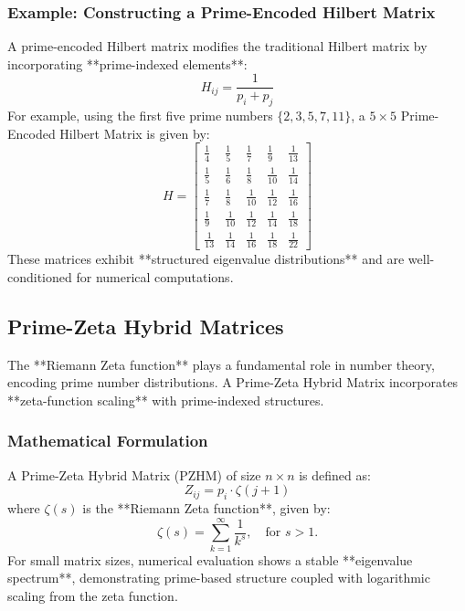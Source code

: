 \documentclass{article}
\theoremstyle{plain}
\begin{document}
\subsubsection{Example: Constructing a Prime-Encoded Hilbert Matrix}
A prime-encoded Hilbert matrix modifies the traditional Hilbert matrix by incorporating **prime-indexed elements**:
\begin{equation}
    H_{ij} = \frac{1}{p_i + p_j}
\end{equation}
For example, using the first five prime numbers \( \{2, 3, 5, 7, 11\} \), a \( 5 \times 5 \) Prime-Encoded Hilbert Matrix is given by:
\[
H =
\begin{bmatrix}
\frac{1}{4} & \frac{1}{5} & \frac{1}{7} & \frac{1}{9} & \frac{1}{13} \\
\frac{1}{5} & \frac{1}{6} & \frac{1}{8} & \frac{1}{10} & \frac{1}{14} \\
\frac{1}{7} & \frac{1}{8} & \frac{1}{10} & \frac{1}{12} & \frac{1}{16} \\
\frac{1}{9} & \frac{1}{10} & \frac{1}{12} & \frac{1}{14} & \frac{1}{18} \\
\frac{1}{13} & \frac{1}{14} & \frac{1}{16} & \frac{1}{18} & \frac{1}{22}
\end{bmatrix}
\]
These matrices exhibit **structured eigenvalue distributions** and are well-conditioned for numerical computations.

\subsection{Prime-Zeta Hybrid Matrices}

The **Riemann Zeta function** plays a fundamental role in number theory, encoding prime number distributions. A Prime-Zeta Hybrid Matrix incorporates **zeta-function scaling** with prime-indexed structures.

\subsubsection{Mathematical Formulation}
A Prime-Zeta Hybrid Matrix (PZHM) of size \( n \times n \) is defined as:
\begin{equation}
    Z_{ij} = p_i \cdot \zeta(j+1)
\end{equation}
where \( \zeta(s) \) is the **Riemann Zeta function**, given by:
\begin{equation}
    \zeta(s) = \sum_{k=1}^{\infty} \frac{1}{k^s}, \quad \text{for } s > 1.
\end{equation}
For small matrix sizes, numerical evaluation shows a stable **eigenvalue spectrum**, demonstrating prime-based structure coupled with logarithmic scaling from the zeta function.
\end{document}
